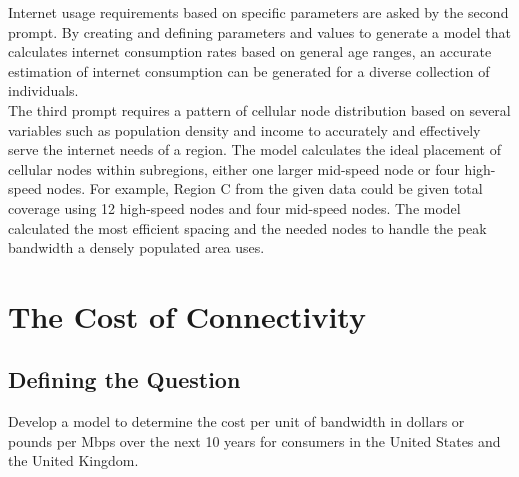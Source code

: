 	\indent Internet usage requirements based on specific parameters are asked by the second prompt. By creating and defining parameters and values to generate a model that calculates internet consumption rates based on general age ranges, an accurate estimation of internet consumption can be generated for a diverse collection of individuals.\\
	\indent The third prompt requires a pattern of cellular node distribution based on several variables such as population density and income to accurately and effectively serve the internet needs of a region. The model calculates the ideal placement of cellular nodes within subregions, either one larger mid-speed node or four high-speed nodes. For example, Region C from the given data could be given total coverage using 12 high-speed nodes and four mid-speed nodes. The model calculated the most efficient spacing and the needed nodes to handle the peak bandwidth a densely populated area uses. 

 
\section{The Cost of Connectivity}
	\subsection{Defining the Question}
	Develop a model to determine the cost per unit of bandwidth in dollars or pounds per Mbps over the next 10 years for consumers in the United States and the United Kingdom.
		
